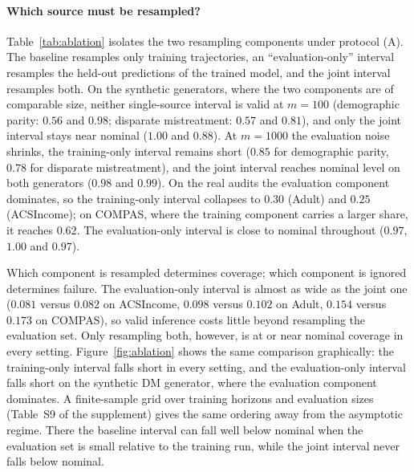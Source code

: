 \documentclass[11pt]{article}
\begin{document}
\paragraph{Which source must be resampled?}
Table~\ref{tab:ablation} isolates the two resampling components under protocol (A).  The baseline
resamples only training trajectories, an ``evaluation-only'' interval resamples the held-out
predictions of the trained model, and the joint interval resamples both.  On the synthetic generators,
where the two components are of comparable size, neither single-source interval is valid at $m=100$
(demographic parity: $0.56$ and $0.98$; disparate mistreatment: $0.57$ and $0.81$), and only the joint
interval stays near nominal ($1.00$ and $0.88$).  At $m=1000$ the evaluation noise shrinks, the
training-only interval remains short ($0.85$ for demographic parity, $0.78$ for disparate mistreatment),
and the joint interval reaches nominal level on both generators ($0.98$ and $0.99$).  On the real
audits the evaluation component dominates, so the training-only interval collapses to $0.30$ (Adult)
and $0.25$ (ACSIncome); on COMPAS, where the training component carries a larger share, it reaches
$0.62$.  The evaluation-only interval is close to nominal throughout ($0.97$, $1.00$ and $0.97$).

Which component is resampled determines coverage; which component is ignored determines failure.  The
evaluation-only interval is almost as wide as the joint one ($0.081$ versus $0.082$ on ACSIncome,
$0.098$ versus $0.102$ on Adult, $0.154$ versus $0.173$ on COMPAS), so valid inference costs little
beyond resampling the evaluation set.  Only resampling both, however, is at or near nominal coverage in
every setting.  Figure~\ref{fig:ablation} shows the same comparison graphically: the training-only interval falls short in every setting, and the evaluation-only interval falls short on the synthetic DM generator, where the evaluation component dominates.  A finite-sample grid over training
horizons and evaluation sizes (Table~S9 of the supplement) gives the same ordering away from the
asymptotic regime.  There the baseline interval can fall well below nominal when the evaluation set is
small relative to the training run, while the joint interval never falls below nominal.
\end{document}
